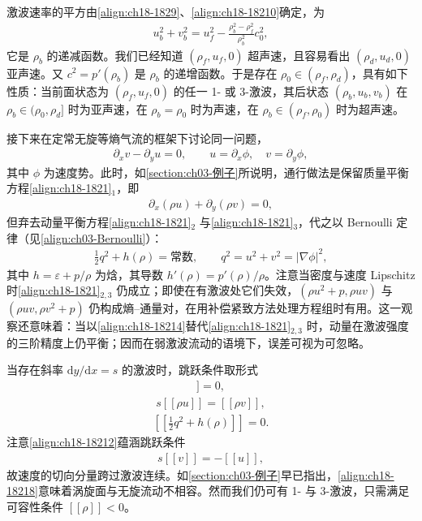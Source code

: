 \documentclass[../../main.tex]{subfiles}
\begin{document}
激波速率的平方由\eqref{align:ch18-1829}、\eqref{align:ch18-18210}确定，为
\begin{align}
u_b^2+v_b^2=u_f^2-\frac{\rho_b^2-\rho_f^2}{\rho_b^2}c_0^2,
\label{align:ch18-18211}
\end{align}
它是 $\rho_b$ 的递减函数。我们已经知道 $(\rho_f,u_f,0)$ 超声速，且容易看出 $(\rho_d,u_d,0)$ 亚声速。又 $c^2=p'(\rho_b)$ 是 $\rho_b$ 的递增函数。于是存在 $\rho_0\in(\rho_f,\rho_d)$，具有如下性质：当前面状态为 $(\rho_f,u_f,0)$ 的任一 1- 或 3-激波，其后状态 $(\rho_b,u_b,v_b)$ 在 $\rho_b\in(\rho_0,\rho_d]$ 时为亚声速，在 $\rho_b=\rho_0$ 时为声速，在 $\rho_b\in(\rho_f,\rho_0)$ 时为超声速。

接下来在定常无旋等熵气流的框架下讨论同一问题，
\begin{align}
\partial_xv-\partial_yu=0,\qquad u=\partial_x\phi,\quad v=\partial_y\phi,
\label{align:ch18-18212}
\end{align}
其中 $\phi$ 为速度势。此时，如\cref{section:ch03-例子}所说明，通行做法是保留质量平衡方程\eqref{align:ch18-1821}$_1$，即
\begin{align}
\partial_x(\rho u)+\partial_y(\rho v)=0,
\label{align:ch18-18213}
\end{align}
但弃去动量平衡方程\eqref{align:ch18-1821}$_2$ 与\eqref{align:ch18-1821}$_3$，代之以 Bernoulli 定律（见\eqref{align:ch03-Bernoulli}）：
\begin{align}
\frac12 q^2+h(\rho)=\text{常数},\qquad q^2=u^2+v^2=|\nabla\phi|^2,
\label{align:ch18-18214}
\end{align}
其中 $h=\varepsilon+p/\rho$ 为焓，其导数 $h'(\rho)=p'(\rho)/\rho$。注意当密度与速度 Lipschitz 时\eqref{align:ch18-1821}$_{2,3}$ 仍成立；即使在有激波处它们失效，$(\rho u^2+p,\rho uv)$ 与 $(\rho uv,\rho v^2+p)$ 仍构成熵--通量对，在用补偿紧致方法处理方程组时有用。这一观察还意味着：当以\eqref{align:ch18-18214}替代\eqref{align:ch18-1821}$_{2,3}$ 时，动量在激波强度的三阶精度上仍平衡；因而在弱激波流动的语境下，误差可视为可忽略。

当存在斜率 $\mathrm{d}y/\mathrm{d}x=s$ 的激波时，跳跃条件取形式
\begin{align}
[\![\phi]\!]=0,
\label{align:ch18-18215}
\end{align}
\begin{align}
s[\![\rho u]\!]=[\![\rho v]\!],
\label{align:ch18-18216}
\end{align}
\begin{align}
\left[\!\left[\frac12 q^2+h(\rho)\right]\!\right]=0.
\label{align:ch18-18217}
\end{align}
注意\eqref{align:ch18-18212}蕴涵跳跃条件
\begin{align}
s[\![v]\!]=-[\![u]\!],
\label{align:ch18-18218}
\end{align}
故速度的切向分量跨过激波连续。如\cref{section:ch03-例子}早已指出，\eqref{align:ch18-18218}意味着涡旋面与无旋流动不相容。然而我们仍可有 1- 与 3-激波，只需满足可容性条件 $[\![\rho]\!]<0$。
\end{document}
